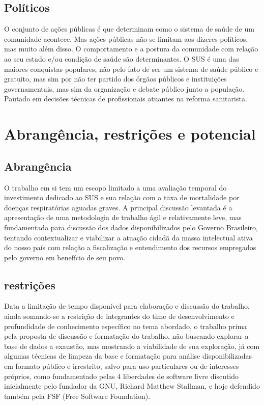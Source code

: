 \documentclass[journal]{IEEEtran}
\begin{document}
\subsection{Políticos}
O conjunto de ações públicas é que determinam como o sistema de saúde de um comunidade acontece. Mas ações públicas não se limitam aos dizeres políticos, mas muito além disso. O comportamento e a postura da comunidade com relação ao seu estado e/ou condição de saúde são determinantes. 
O SUS é uma das maiores conquistas populares, não pelo fato de ser um sistema de saúde público e gratuito, mas sim por não ter partido dos órgãos públicos e instituições governamentais, mas sim  da organização e debate público junto a população. Pautado em decisões técnicas de profissionais atuantes na reforma sanitarista. \cite{o_que_e_sus}

\section{Abrangência, restrições e potencial}
\subsection{Abrangência}
O trabalho em si tem um escopo limitado a uma avaliação temporal do investimento dedicado ao SUS e sua relação com a taxa de mortalidade por doenças respiratórias aguadas graves. 
A principal discussão levantada é a apresentação de uma metodologia de trabalho ágil e relativamente leve, mas  fundamentada para discussão dos dados disponibilizados pelo Governo Brasileiro, tentando contextualizar e viabilizar a atuação cidadã da massa intelectual ativa do nosso país com relação a fiscalização e entendimento dos recursos empregados pelo governo em benefício de seu povo.

\subsection{restrições}
Data a limitação de tempo disponível para elaboração e discussão do trabalho, ainda somando-se a restrição de integrantes do time de desenvolvimento e profundidade de conhecimento específico no tema abordado, o trabalho prima pela proposta de discussão e formatação do trabalho, não buscando explorar a base de dados a exaustão, mas mostrando a viabilidade de sua exploração, já com algumas técnicas de limpeza da base e formatação para análise disponibilizadas em formato público e irrestrito, salvo para uso particulares ou de interesses próprios, como fundamentado pelas 4 liberdades de software livre \cite{gnu} discutido inicialmente pelo fundador da GNU, Richard Matthew Stallman, e hoje defendido também pela FSF (Free Software Foundation).
\end{document}
